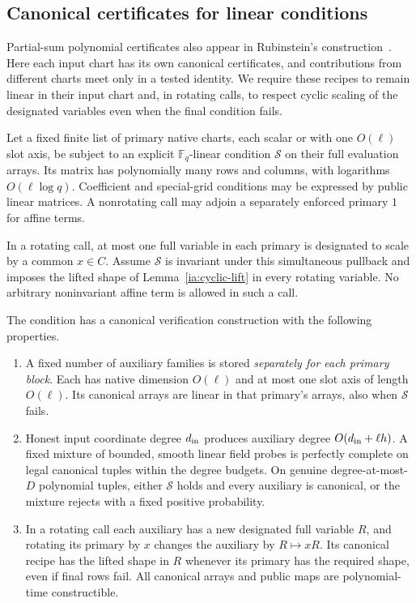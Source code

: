 \subsection{Canonical certificates for linear conditions}
\label{ia:linear-certificates}

Partial-sum polynomial certificates also appear in Rubinstein's
construction~\cite[Sections~6.2--6.3]{Rubinstein2016Settling}.
Here each input chart has its own canonical certificates, and contributions
from different charts meet only in a tested identity.  We require these
recipes to remain linear in their input chart and, in rotating calls, to
respect cyclic scaling of the designated variables even when the final
condition fails.

\begin{lemma}\label{ia:linear-tool}
Let a fixed finite list of primary native charts, each scalar or with
one $O(\ell)$ slot axis, be subject to an explicit
$\mathbb F_q$-linear condition $\mathcal S$ on their full evaluation
arrays.  Its matrix has polynomially many rows and columns, with
logarithms $O(\ell\log q)$.  Coefficient and special-grid conditions
may be expressed by public linear matrices.  A nonrotating call may
adjoin a separately enforced primary $1$ for affine terms.

In a rotating call, at most one full variable in each primary is
designated to scale by a common $x\in C$.  Assume $\mathcal S$ is
invariant under this simultaneous pullback and imposes the lifted
shape of Lemma~\ref{ia:cyclic-lift} in every rotating variable.  No
arbitrary noninvariant affine term is allowed in such a call.

The condition has a canonical verification construction with the
following properties.
\begin{enumerate}
\item A fixed number of auxiliary families is stored \emph{separately
for each primary block}.  Each has native dimension $O(\ell)$ and at
most one slot axis of length $O(\ell)$.  Its canonical arrays are
linear in that primary's arrays, also when $\mathcal S$ fails.
\item Honest input coordinate degree $d_{\rm in}$ produces auxiliary
degree $O(d_{\rm in}+\ell h)$.  A fixed mixture of bounded, smooth
linear field probes is perfectly complete on legal canonical tuples
within the degree budgets.  On genuine degree-at-most-$D$ polynomial
tuples, either $\mathcal S$ holds and every auxiliary is canonical, or
the mixture rejects with a fixed positive probability.
\item In a rotating call each auxiliary has a new designated full
variable $R$, and rotating its primary by $x$ changes the auxiliary by
$R\mapsto xR$.  Its canonical recipe has the lifted shape in $R$
whenever its primary has the required shape, even if final rows fail.
All canonical arrays and public maps are polynomial-time constructible.
\end{enumerate}
\end{lemma}

